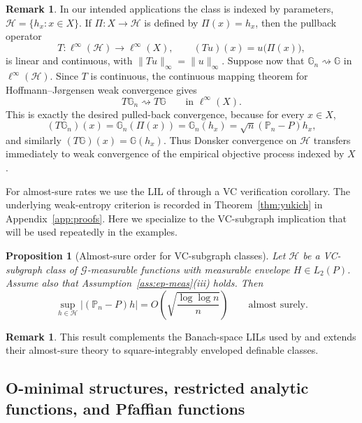 \documentclass[11pt]{article}
\newtheorem{proposition}[theorem]{Proposition}\newtheorem{lemma}[theorem]{Lemma}\newtheorem{corollary}[theorem]{Corollary}\newtheorem{assumption}{Assumption}[section]\theoremstyle{definition}
\newtheorem{remark}[theorem]{Remark}
\begin{document}
\begin{remark}\label{rem:pullback} In our intended applications
the class is indexed by parameters, $\mathcal{H}=\{h_{x}:x\in X\}$.
If $\Pi:X\to\mathcal{H}$ is defined by $\Pi(x)=h_{x}$, then the
pullback operator 
\[
T:\ell^{\infty}(\mathcal{H})\to\ell^{\infty}(X),\qquad(Tu)(x)=u\bigl(\Pi(x)\bigr),
\]
is linear and continuous, with $\lVert Tu\rVert_{\infty}=\lVert u\rVert_{\infty}$.
Suppose now that $\mathbb{G}_{n}\rightsquigarrow\mathbb{G}$ in $\ell^{\infty}(\mathcal{H})$.
Since $T$ is continuous, the continuous mapping theorem for Hoffmann--Jørgensen
weak convergence gives 
\[
T\mathbb{G}_{n}\rightsquigarrow T\mathbb{G}\qquad\text{in }\ell^{\infty}(X).
\]
This is exactly the desired pulled-back convergence, because for every
$x\in X$, 
\[
(T\mathbb{G}_{n})(x)=\mathbb{G}_{n}(\Pi(x))=\mathbb{G}_{n}(h_{x})=\sqrt{n}(\mathbb{P}_{n}-P)h_{x},
\]
and similarly $(T\mathbb{G})(x)=\mathbb{G}(h_{x})$. Thus Donsker
convergence on $\mathcal{H}$ transfers immediately to weak convergence
of the empirical objective process indexed by $X$. \end{remark}

For almost-sure rates we use the LIL of \citet{Yukich1990}
through a VC verification corollary. The underlying weak-entropy criterion
is recorded in Theorem~\ref{thm:yukich} in Appendix~\ref{app:proofs}.
Here we specialize to the VC-subgraph implication that will be used
repeatedly in the examples.

\begin{proposition}[Almost-sure order for VC-subgraph classes]\label{prop:vc-yukich}
Let $\mathcal{H}$ be a VC-subgraph class of $\mathcal{G}$-measurable
functions with measurable envelope $H\in L_{2}(P)$.
Assume also that Assumption~\ref{ass:ep-meas}(iii) holds. Then
\begin{equation}
\sup_{h\in\mathcal{H}}\lvert(\mathbb{P}_{n}-P)h\rvert=O\!\left(\sqrt{\frac{\log\log n}{n}}\right)\qquad\text{almost surely}.\label{eq:vc-blil-rate}
\end{equation}
\end{proposition}

\begin{remark} This result complements the Banach-space LILs used
by \citet{Banholzer2022} and extends their almost-sure theory to square-integrably
enveloped definable classes. \end{remark}

\subsection{O-minimal structures, restricted analytic functions, and Pfaffian
functions}
\end{document}
